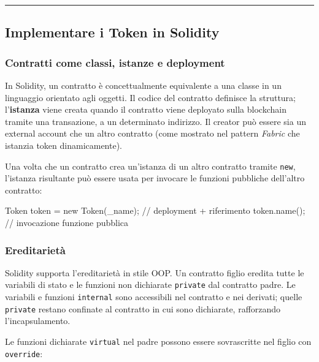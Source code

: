 \documentclass[
  italian,
  openany]{book}
\newenvironment{Shaded}{\begin{snugshade}}{\end{snugshade}}
\newcommand{\NormalTok}[1]{#1}
\begin{document}
\begin{center}\rule{0.5\linewidth}{0.5pt}\end{center}

\subsection{Implementare i Token in
Solidity}\label{implementare-i-token-in-solidity}

\subsubsection{Contratti come classi, istanze e
deployment}\label{contratti-come-classi-istanze-e-deployment}

In Solidity, un contratto è concettualmente equivalente a una classe in
un linguaggio orientato agli oggetti. Il codice del contratto definisce
la struttura; l'\textbf{istanza} viene creata quando il contratto viene
deployato sulla blockchain tramite una transazione, a un determinato
indirizzo. Il creator può essere sia un external account che un altro
contratto (come mostrato nel pattern \emph{Fabric} che istanzia token
dinamicamente).

Una volta che un contratto crea un'istanza di un altro contratto tramite
\texttt{new}, l'istanza risultante può essere usata per invocare le
funzioni pubbliche dell'altro contratto:

\begin{Shaded}
\begin{Highlighting}[]
\NormalTok{Token token = new Token(\_name);   // deployment + riferimento}
\NormalTok{token.name();                     // invocazione funzione pubblica}
\end{Highlighting}
\end{Shaded}

\subsubsection{Ereditarietà}\label{ereditarietuxe0}

Solidity supporta l'ereditarietà in stile OOP. Un contratto figlio
eredita tutte le variabili di stato e le funzioni non dichiarate
\texttt{private} dal contratto padre. Le variabili e funzioni
\texttt{internal} sono accessibili nel contratto e nei derivati; quelle
\texttt{private} restano confinate al contratto in cui sono dichiarate,
rafforzando l'incapsulamento.

Le funzioni dichiarate \texttt{virtual} nel padre possono essere
sovrascritte nel figlio con \texttt{override}:
\end{document}
